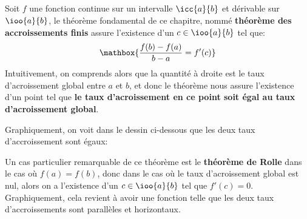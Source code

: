 \subsection*{}
Soit \(f\) une fonction continue sur un intervalle \(\icc{a}{b}\) et dérivable sur \(\ioo{a}{b}\), le théorème fondamental de ce chapitre, nommé \textbf{théorème des accroissements finis} assure l'existence d'un \(c \in \ioo{a}{b}\) tel que:
\[
   \mathbox{\frac{f(b) - f(a)}{b - a} = f'(c)}   
\]
Intuitivement, on comprends alors que la quantité à droite est le taux d'acroissement global entre \(a\) et \(b\), et donc le théorème nous assure l'existence d'un point tel que \textbf{le taux d'acroissement en ce point soit égal au taux d'acroissement global}.
\pagebreak

Graphiquement, on voit dans le dessin ci-dessous que les deux taux d'accroissement sont égaux:
\begin{center}
\end{center}
Un cas particulier remarquable de ce théorème est le \textbf{théorème de Rolle} dans le cas où \(f(a) = f(b)\), donc dans le cas où le taux d'acroissement global est nul, alors on a l'existence d'un \(c \in \ioo{a}{b}\) tel que \(f'(c) = 0\).\+ 
Graphiquement, cela revient à avoir une fonction telle que les deux taux d'accroissements sont parallèles et horizontaux. 

